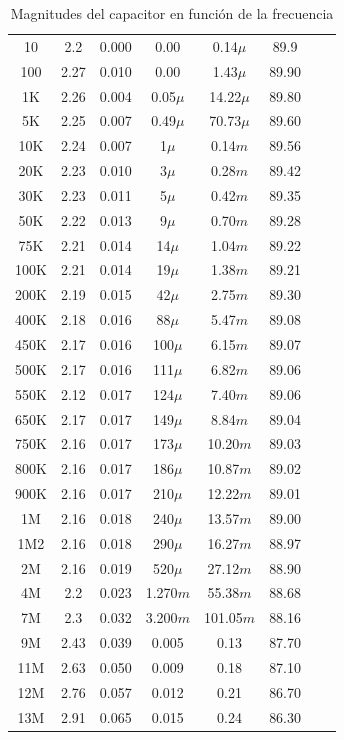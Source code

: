 \documentclass[11pt, a4paper]{article}
\begin{document}
\begin{center}
\begin{table}[H]
\begin{tabular}{ c c c c c c c c }
             \hline
             10   & 2.2  & 0.000 & 0.00       & 0.14$\mu$   & 89.9  \\
			100  & 2.27 & 0.010 & 0.00       & 1.43$\mu$   & 89.90 \\
			1K   & 2.26 & 0.004 & 0.05$\mu$   & 14.22$\mu$  & 89.80 \\
			5K   & 2.25 & 0.007 & 0.49$\mu$   & 70.73$\mu$  & 89.60 \\
			10K  & 2.24 & 0.007 & 1$\mu$ & 0.14$m$ & 89.56 \\
			20K  & 2.23 & 0.010 & 3$\mu$ & 0.28$m$ & 89.42 \\
			30K  & 2.23 & 0.011 & 5$\mu$  & 0.42$m$    & 89.35 \\
			50K  & 2.22 & 0.013 & 9$\mu$  & 0.70$m$  & 89.28 \\
			75K  & 2.21 & 0.014 & 14$\mu$  & 1.04$m$   & 89.22 \\
			100K & 2.21 & 0.014 & 19$\mu$   & 1.38$m$   & 89.21 \\
			200K & 2.19 & 0.015 & 42$\mu$   & 2.75$m$  & 89.30 \\
			400K & 2.18 & 0.016 & 88$\mu$   & 5.47$m$   & 89.08 \\
			450K & 2.17 & 0.016 & 100$\mu$    & 6.15$m$  & 89.07 \\
			500K & 2.17 & 0.016 & 111$\mu$   & 6.82$m$  & 89.06 \\
			550K & 2.12 & 0.017 & 124$\mu$   & 7.40$m$    & 89.06 \\
			650K & 2.17 & 0.017 & 149$\mu$   & 8.84$m$   & 89.04 \\
			750K & 2.16 & 0.017 & 173$\mu$   & 10.20$m$   & 89.03 \\
			800K & 2.16 & 0.017 & 186$\mu$   & 10.87$m$  & 89.02 \\
			900K & 2.16 & 0.017 & 210$\mu$    & 12.22$m$  & 89.01 \\
			1M   & 2.16 & 0.018 & 240$\mu$    & 13.57$m$  & 89.00 \\
			1M2  & 2.16 & 0.018 & 290$\mu$    & 16.27$m$  & 88.97 \\
			2M   & 2.16 & 0.019 & 520$\mu$    & 27.12$m$ & 88.90 \\
			4M   & 2.2  & 0.023 & 1.270$m$   & 55.38$m$  & 88.68 \\
			7M   & 2.3  & 0.032 & 3.200$m$    & 101.05$m$ & 88.16 \\
			9M   & 2.43 & 0.039 & 0.005   & 0.13  & 87.70 \\
			11M  & 2.63 & 0.050 & 0.009   & 0.18   & 87.10 \\
			12M  & 2.76 & 0.057 & 0.012   & 0.21   & 86.70 \\
			13M  & 2.91 & 0.065 & 0.015   & 0.24   & 86.30 \\
            \hline 
        \end{tabular}
        \caption{Magnitudes del capacitor en función de la frecuencia}
        \label{table:Rta_en_frecuencia_capacitor}
    \end{table}
\end{center}
\end{document}
